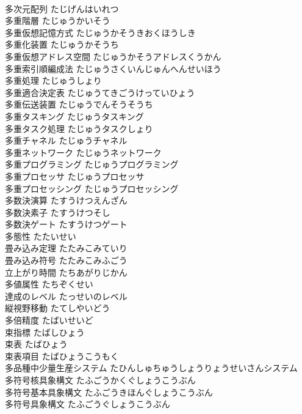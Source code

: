 \documentclass[8pt]{extreport}
\begin{document}
\begin{CJK}{UTF8}{min}
\\	多次元配列	たじげんはいれつ	
\\	多重階層	たじゅうかいそう	
\\	多重仮想記憶方式	たじゅうかそうきおくほうしき	
\\	多重化装置	たじゅうかそうち	
\\	多重仮想アドレス空間	たじゅうかそうアドレスくうかん	
\\	多重索引順編成法	たじゅうさくいんじゅんへんせいほう	
\\	多重処理	たじゅうしょり	
\\	多重適合決定表	たじゅうてきごうけっていひょう	
\\	多重伝送装置	たじゅうでんそうそうち	
\\	多重タスキング	たじゅうタスキング	
\\	多重タスク処理	たじゅうタスクしょり	
\\	多重チャネル	たじゅうチャネル	
\\	多重ネットワーク	たじゅうネットワーク	
\\	多重プログラミング	たじゅうプログラミング	
\\	多重プロセッサ	たじゅうプロセッサ	
\\	多重プロセッシング	たじゅうプロセッシング	
\\	多数決演算	たすうけつえんざん	
\\	多数決素子	たすうけつそし	
\\	多数決ゲート	たすうけつゲート	
\\	多態性	たたいせい	
\\	畳み込み定理	たたみこみていり	
\\	畳み込み符号	たたみこみふごう	
\\	立上がり時間	たちあがりじかん	
\\	多値属性	たちぞくせい	
\\	達成のレベル	たっせいのレベル	
\\	縦視野移動	たてしやいどう	
\\	多倍精度	たばいせいど	
\\	束指標	たばしひょう	
\\	束表	たばひょう	
\\	束表項目	たばひょうこうもく	
\\	多品種中少量生産システム	たひんしゅちゅうしょうりょうせいさんシステム	
\\	多符号核具象構文	たふごうかくぐしょうこうぶん	
\\	多符号基本具象構文	たふごうきほんぐしょうこうぶん	
\\	多符号具象構文	たふごうぐしょうこうぶん	

\end{CJK}
\end{document}
